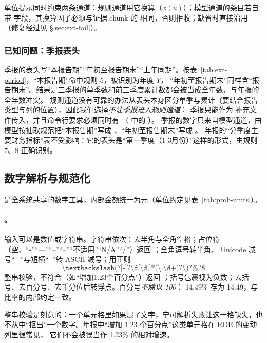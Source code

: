 单位提示同时约束两条通道：规则通道用它换算（$\phi(u)$）；模型通道的条目若自带  字段，其换算因子必须与证据 chunk 的  相同，否则拒收；缺省时直接沿用 （修复经过见 \S\ref{sec:ext-fail}）。

\subsubsection{已知问题：季报表头}
\label{sec:ext-q-header}

季报的表头写“本报告期”“年初至报告期末”“上年同期”。按表~\ref{tab:ext-period}，“本报告期”命中规则 5，被识别为年度 $Y$，
“年初至报告期末”同样含“报告期末”。结果是三季报的单季数和前三季度累计数都会被当成全年数，与年报的全年数冲突。
规则通道没有可靠的办法从表头本身区分单季与累计（要结合报告类型与列的位置），因此我们选择\emph{不让季报进入规则通道}：
季报只能作为  补充文件传入，并且命令行要求必须同时有 （ 中的 ）。
季报的数字只来自模型通道，由模型按抽取规范把“本报告期”写成 、“年初至报告期末”写成 。
年报的“分季度主要财务指标”表不受影响：它的表头是“第一季度（1-3月份）”这样的形式，由规则 7、8 正确识别。

\subsection{数字解析与规范化}
\label{sec:ext-numbers}

 是全系统共享的数字工具，内部金额统一为元（单位约定见表~\ref{tab:prob-units}）。

\paragraph{。}
输入可以是数值或字符串。字符串依次：去半角与全角空格；占位符（空、“-”“—”“–”“--”“不适用”“N/A”“/”）返回 ；全角逗号转半角，
Unicode 减号“−”与短横“–”转 ASCII 减号；用正则
\[
\texttt{\^{}\textbackslash(?[-]?\textbackslash d[\textbackslash d,]*(\textbackslash .\textbackslash d+)?\textbackslash)?\%?\$}
\]
整串校验，不符合（如“增加1.23个百分点”）返回 ；括号包裹视为负数；去括号、去百分号、去千分位后转浮点。百分号\emph{不除以 100}：
14.49\% 存为 14.49，与比率的内部约定一致。

整串校验是刻意的：一个单元格里如果混了文字，宁可解析失败让这一格缺失，也不从中“抠出”一个数字。年报中“增加 1.23 个百分点”这类单元格在 ROE 的变动列里很常见，
它们不会被误当作 1.23\% 的相对增速。

